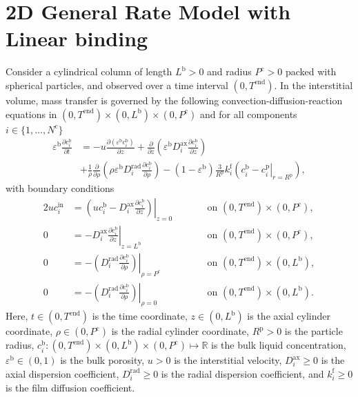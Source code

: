 \documentclass{article}
\begin{document}
\section*{2D General Rate Model with Linear binding}
Consider a cylindrical column of length $L^{\mathrm{b}} > 0$ and radius $P^{\mathrm{c}} > 0$ packed with spherical particles, and observed over a time interval $(0, T^{\mathrm{end}})$.
In the interstitial volume, mass transfer is governed by the following convection-diffusion-reaction equations in $(0, T^{\mathrm{end}})\times (0, L^{\mathrm{b}})\times (0, P^{\mathrm{c}})$ and for all components $i\in\{1, \dots, N^{\mathrm{c}} \}$
\begin{align}
    \varepsilon^{\mathrm{b}} \frac{\partial c^{\mathrm{b}}_{i}}{\partial t}
    &= - u \frac{\partial \left( \varepsilon^{\mathrm{b}} c^{\mathrm{b}}_{i} \right)}{\partial z}
        + \frac{\partial}{\partial z} \left( \varepsilon^{\mathrm{b}} D^{\mathrm{ax}}_{i} \frac{\partial c^{\mathrm{b}}_{i}}{\partial z} \right) \nonumber
    \\
    &+ \frac{1}{\rho} \frac{\partial}{\partial \rho} \left( \rho \varepsilon^{\mathrm{b}} D^{\mathrm{rad}}_{i} \frac{\partial c^{\mathrm{b}}_{i}}{\partial \rho} \right)
        - \left(1 - \varepsilon^{\mathrm{b}} \right) \frac{3}{R^{\mathrm{p}}} k^{\mathrm{f}}_{i} \left(c^{\mathrm{b}}_{i} - \left. c^{\mathrm{p}}_{i} \right|_{r = R^{\mathrm{p}}} \right),
\end{align}
with boundary conditions
\begin{alignat}{2}
    u c^{\mathrm{in}}_{i}
    &= \left.\left( u c^{\mathrm{b}}_{i} - D^{\mathrm{ax}}_{i} \frac{\partial c^{\mathrm{b}}_{i}}{\partial z}\right)\right|_{z=0}
    & & \qquad\text{on }(0, T^{\mathrm{end}})\times (0, P^{\mathrm{c}}),
    \\
    0
    &= - D^{\mathrm{ax}}_{i} \left. \frac{\partial c^{\mathrm{b}}_{i}}{\partial z} \right|_{z=L^{\mathrm{b}}}
    & & \qquad\text{on }(0, T^{\mathrm{end}})\times (0, P^{\mathrm{c}}),
    \\
    0
    &= - \left(D^{\mathrm{rad}}_{i} \left. \frac{\partial c^{\mathrm{b}}_{i}}{\partial \rho} \right) \right|_{\rho=P^{\mathrm{c}}}
    & & \qquad\text{on }(0, T^{\mathrm{end}}) \times (0, L^{\mathrm{b}}),
    \\
    0
    &= - \left(D^{\mathrm{rad}}_{i} \left. \frac{\partial c^{\mathrm{b}}_{i}}{\partial \rho} \right) \right|_{\rho=0}
    & & \qquad\text{on }(0, T^{\mathrm{end}}) \times (0, L^{\mathrm{b}}).
\end{alignat}
Here, $t\in (0, T^{\mathrm{end}})$ is the time coordinate, $z\in (0, L^{\mathrm{b}})$ is the axial cylinder coordinate, $\rho\in (0, P^{\mathrm{c}})$ is the radial cylinder coordinate, $R^{\mathrm{p}}> 0$ is the particle radius, $c^{\mathrm{b}}_{i}\colon (0, T^{\mathrm{end}})\times (0, L^{\mathrm{b}})\times (0, P^{\mathrm{c}}) \mapsto \mathbb{R}$ is the bulk liquid concentration, $\varepsilon^{\mathrm{b}}\in (0, 1)$ is the bulk porosity, $u> 0$ is the interstitial velocity, $D^{\mathrm{ax}}_{i}\geq 0$ is the axial dispersion coefficient, $D^{\mathrm{rad}}_{i}\geq 0$ is the radial dispersion coefficient, and $k^{\mathrm{f}}_{i}\geq 0$ is the film diffusion coefficient.
\end{document}
